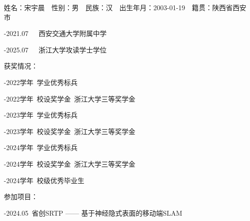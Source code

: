 \cleardoublepage
{}
姓名：宋宇晨~~性别：男~~民族：汉~~出生年月：2003-01-19~~籍贯：陕西省西安市

-2021.07~~~西安交通大学附属中学

-2025.07~~~浙江大学攻读学士学位

\noindent 获奖情况：

-2022学年~学业优秀标兵

-2022学年~校设奖学金~浙江大学三等奖学金

-2023学年~学业优秀标兵

-2023学年~校设奖学金~浙江大学三等奖学金

-2024学年~学业优秀标兵

-2024学年~校设奖学金~浙江大学三等奖学金

-2024学年~校级优秀毕业生

\noindent 参加项目：

-2024.05~省创SRTP —— 基于神经隐式表面的移动端SLAM